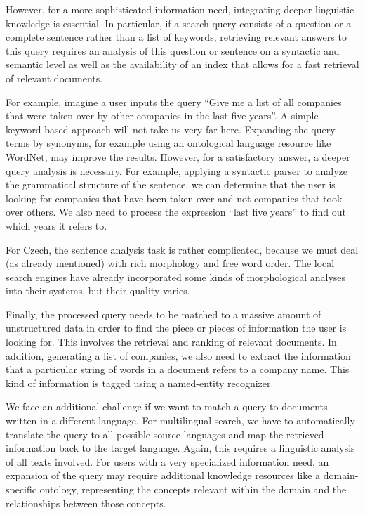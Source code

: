 \begin{multicols}{2}
However, for a more sophisticated information need, integrating deeper linguistic knowledge is essential. In particular, if a search query consists of a question or a complete sentence rather than a list of keywords, retrieving relevant answers to this query requires an analysis of this question or sentence on a syntactic and semantic level as well as the availability of an index that allows for a fast retrieval of relevant documents.

For example, imagine a user inputs the query “Give me a list of all companies that were taken over by other companies in the last five years”. A simple keyword-based approach will not take us very far here. Expanding the query terms by synonyms, for example using an ontological language resource like WordNet, may improve the results. However, for a satisfactory answer, a deeper query analysis is necessary. For example, applying a syntactic parser to analyze the grammatical structure of the sentence, we can determine that the user is looking for companies that have been taken over and not companies that took over others. We also need to process the expression “last five years” to find out which years it refers to.

For Czech, the sentence analysis task is rather complicated, because we must deal (as already mentioned) with rich morphology and free word order. The local search engines have already incorporated some kinds of morphological analyses into their systems, but their quality varies.

Finally, the processed query needs to be matched to a massive amount of unstructured data in order to find the piece or pieces of information the user is looking for. This involves the retrieval and ranking of relevant documents. In addition, generating a list of companies, we also need to extract the information that a particular string of words in a document refers to a company name. This kind of information is tagged using a named-entity recognizer.

We face an additional challenge if we want to match a query to documents written in a different language. For multilingual search, we have to automatically translate the query to all possible source languages and map the retrieved information back to the target language. Again, this requires a linguistic analysis of all texts involved. For users with a very specialized information need, an expansion of the query may require additional knowledge resources like a domain-specific ontology, representing the concepts relevant within the domain and the relationships between those concepts.


\end{multicols}
